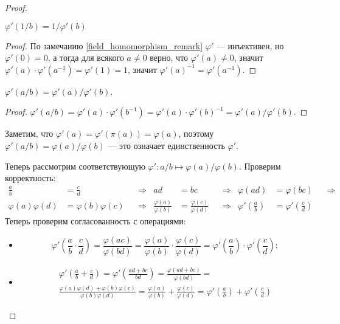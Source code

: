 \documentclass[12pt,a4paper]{article}
\begin{document}
    \begin{proof}
        \begin{thlemma}
            $\varphi'(1/b) = 1/\varphi'(b)$
        \end{thlemma}

        \begin{proof}
            По замечанию \ref{field_homomorphism_remark} $\varphi'$ --- инъективен, но $\varphi'(0) = 0$, а тогда для всякого $a \neq 0$ верно, что $\varphi'(a) \neq 0$, значит $\varphi'(a) \cdot \varphi'(a^{-1}) = \varphi'(1) = 1$, значит $\varphi'(a)^{-1} = \varphi'(a^{-1})$.
        \end{proof}

        \begin{thlemma}
            $\varphi'(a/b) = \varphi'(a)/\varphi'(b)$.
        \end{thlemma}

        \begin{proof}
            $\varphi'(a/b) = \varphi'(a) \cdot \varphi'(b^{-1}) = \varphi'(a) \cdot \varphi'(b)^{-1} = \varphi'(a)/\varphi'(b)$.
        \end{proof}

        Заметим, что $\varphi'(a) = \varphi'(\pi(a)) = \varphi(a)$, поэтому $\varphi'(a/b) = \varphi(a)/\varphi(b)$ --- это означает единственность $\varphi'$.

        Теперь рассмотрим соответствующую $\varphi': a/b \mapsto \varphi(a)/\varphi(b)$. Проверим корректность:
        \begin{align*}
            \frac{a}{b} &= \frac{c}{d}&
            &\Rightarrow&
            ad &= bc&
            &\Rightarrow&
            \varphi(ad) &= \varphi(bc)&
            &\Rightarrow\\
            \varphi(a)\varphi(d) &= \varphi(b)\varphi(c)&
            &\Rightarrow&
            \frac{\varphi(a)}{\varphi(b)} &= \frac{\varphi(c)}{\varphi(d)}&
            &\Rightarrow&
            \varphi'\left(\frac{a}{b}\right) &= \varphi'\left(\frac{c}{d}\right)
        \end{align*}
        Теперь проверим согласованность с операциями:
        \begin{itemize}
            \item \[\varphi'\left(\frac{a}{b}\cdot \frac{c}{d}\right) = \frac{\varphi(ac)}{\varphi(bd)}=\frac{\varphi(a)}{\varphi(b)}\cdot\frac{\varphi(c)}{\varphi(d)}=\varphi'\left(\frac{a}{b}\right)\cdot\varphi'\left(\frac{c}{d}\right);\]
            \item
                \begin{multline*}
                    \varphi'\left(\frac{a}{b} + \frac{c}{d}\right) = \varphi'\left(\frac{ad + bc}{bd}\right) = \frac{\varphi(ad + bc)}{\varphi(bd)} = \\
                    \frac{\varphi(a)\varphi(d) + \varphi(b)\varphi(c)}{\varphi(b)\varphi(d)} = \frac{\varphi(a)}{\varphi(b)} + \frac{\varphi(c)}{\varphi(d)} = \varphi'\left(\frac{a}{b}\right) + \varphi'\left(\frac{c}{d}\right)
                \end{multline*}
        \end{itemize}
        
    \end{proof}
\end{document}
